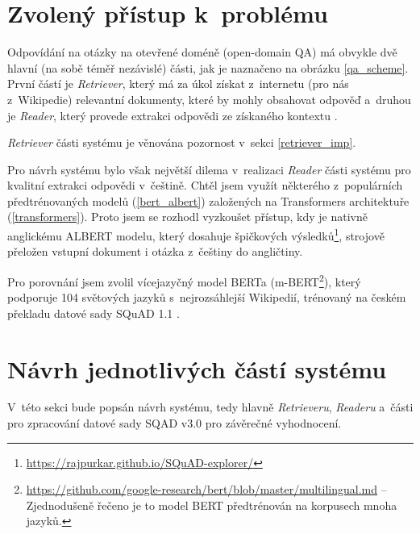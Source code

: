\section{Zvolený přístup k~problému}
Odpovídání na otázky na otevřené doméně (open-domain QA) má obvykle dvě hlavní (na sobě téměř nezávislé) části, jak je naznačeno na obrázku \ref{qa_scheme}. První částí je \emph{Retriever}, který má za úkol získat z~internetu (pro nás z~Wikipedie) relevantní dokumenty, které by mohly obsahovat odpověď a~druhou je \emph{Reader}, který provede extrakci odpovědi ze získaného kontextu \cite{drQA}.\par
\noindent\emph{Retriever} části systému je věnována pozornost v~sekci \ref{retriever_imp}.\par
Pro návrh systému bylo však největší dilema v~realizaci \emph{Reader} části systému pro kvalitní extrakci odpovědi v~češtině. Chtěl jsem využít některého z~populárních předtrénovaných modelů (\ref{bert_albert}) založených na Transformers \cite{Transformers} architektuře (\ref{transformers}). Proto jsem se rozhodl vyzkoušet přístup, kdy je nativně anglickému ALBERT modelu, který dosahuje špičkových výsledků\footnote{\url{https://rajpurkar.github.io/SQuAD-explorer/}}, strojově přeložen vstupní dokument i otázka z~češtiny do angličtiny.\par
Pro porovnání jsem zvolil vícejazyčný model BERTa (m-BERT\footnote{\url{https://github.com/google-research/bert/blob/master/multilingual.md} -- Zjednodušeně řečeno je to model BERT předtrénován na korpusech mnoha jazyků.}), který podporuje 104 světových jazyků s~nejrozsáhlejší Wikipedií, trénovaný na českém překladu datové sady SQuAD 1.1 \cite{czech_squad} \cite{squad}.\par

\section{Návrh jednotlivých částí systému}
\label{design}
V~této sekci bude popsán návrh systému, tedy hlavně \emph{Retrieveru}, \emph{Readeru} a~části pro zpracování datové sady SQAD v3.0 \cite{sqad} pro závěrečné vyhodnocení.

